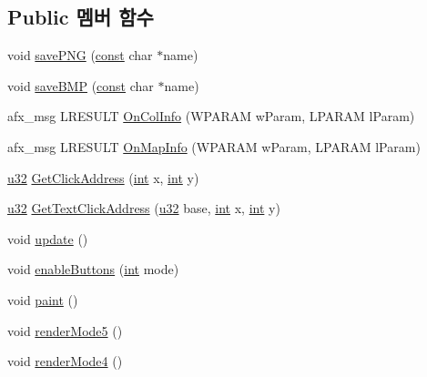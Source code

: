 \subsection*{Public 멤버 함수}
\begin{DoxyCompactItemize}
\item 
void \mbox{\hyperlink{class_map_view_afadc38148227210fd5d8e12c50e7f22d}{save\+P\+NG}} (\mbox{\hyperlink{getopt1_8c_a2c212835823e3c54a8ab6d95c652660e}{const}} char $\ast$name)
\item 
void \mbox{\hyperlink{class_map_view_a792d85841dc88e63ab7f31ed6de066d7}{save\+B\+MP}} (\mbox{\hyperlink{getopt1_8c_a2c212835823e3c54a8ab6d95c652660e}{const}} char $\ast$name)
\item 
afx\+\_\+msg L\+R\+E\+S\+U\+LT \mbox{\hyperlink{class_map_view_ae6fd15cfd77671946d4ad08f901bde3c}{On\+Col\+Info}} (W\+P\+A\+R\+AM w\+Param, L\+P\+A\+R\+AM l\+Param)
\item 
afx\+\_\+msg L\+R\+E\+S\+U\+LT \mbox{\hyperlink{class_map_view_a9d5b068db40e4d9641bfeca9f81bb53a}{On\+Map\+Info}} (W\+P\+A\+R\+AM w\+Param, L\+P\+A\+R\+AM l\+Param)
\item 
\mbox{\hyperlink{_system_8h_a10e94b422ef0c20dcdec20d31a1f5049}{u32}} \mbox{\hyperlink{class_map_view_ad05aa1227f5a62d8e9477eeeec37115c}{Get\+Click\+Address}} (\mbox{\hyperlink{_util_8cpp_a0ef32aa8672df19503a49fab2d0c8071}{int}} x, \mbox{\hyperlink{_util_8cpp_a0ef32aa8672df19503a49fab2d0c8071}{int}} y)
\item 
\mbox{\hyperlink{_system_8h_a10e94b422ef0c20dcdec20d31a1f5049}{u32}} \mbox{\hyperlink{class_map_view_a30bef411235a6b8666f34991c2b90619}{Get\+Text\+Click\+Address}} (\mbox{\hyperlink{_system_8h_a10e94b422ef0c20dcdec20d31a1f5049}{u32}} base, \mbox{\hyperlink{_util_8cpp_a0ef32aa8672df19503a49fab2d0c8071}{int}} x, \mbox{\hyperlink{_util_8cpp_a0ef32aa8672df19503a49fab2d0c8071}{int}} y)
\item 
void \mbox{\hyperlink{class_map_view_ac41eb53f60bccbfe4f5601f1a997c51e}{update}} ()
\item 
void \mbox{\hyperlink{class_map_view_aad00c64b13ff280b4279a7f8cd57b083}{enable\+Buttons}} (\mbox{\hyperlink{_util_8cpp_a0ef32aa8672df19503a49fab2d0c8071}{int}} mode)
\item 
void \mbox{\hyperlink{class_map_view_a89edf3053cffa4a68516178dbd987339}{paint}} ()
\item 
void \mbox{\hyperlink{class_map_view_a8f6282ba1ec4a295b2fb33a41e541ba1}{render\+Mode5}} ()
\item 
void \mbox{\hyperlink{class_map_view_a2e10ddf467ef8b43907459790c20016e}{render\+Mode4}} ()

\end{DoxyCompactItemize}
